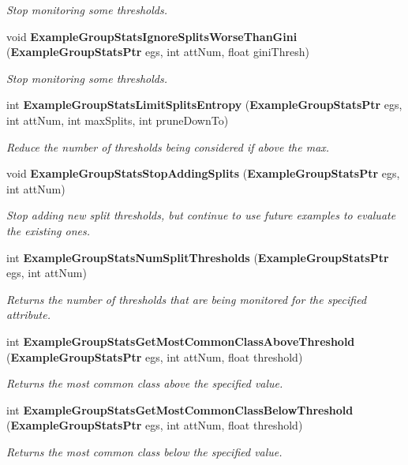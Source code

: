 \begin{CompactItemize}
\begin{CompactList}\small\item\em Stop monitoring some thresholds. \item\end{CompactList}\item 
void {\bf Example\-Group\-Stats\-Ignore\-Splits\-Worse\-Than\-Gini} ({\bf Example\-Group\-Stats\-Ptr} egs, int att\-Num, float gini\-Thresh)
\begin{CompactList}\small\item\em Stop monitoring some thresholds. \item\end{CompactList}\item 
int {\bf Example\-Group\-Stats\-Limit\-Splits\-Entropy} ({\bf Example\-Group\-Stats\-Ptr} egs, int att\-Num, int max\-Splits, int prune\-Down\-To)
\begin{CompactList}\small\item\em Reduce the number of thresholds being considered if above the max. \item\end{CompactList}\item 
void {\bf Example\-Group\-Stats\-Stop\-Adding\-Splits} ({\bf Example\-Group\-Stats\-Ptr} egs, int att\-Num)
\begin{CompactList}\small\item\em Stop adding new split thresholds, but continue to use future examples to evaluate the existing ones. \item\end{CompactList}\item 
int {\bf Example\-Group\-Stats\-Num\-Split\-Thresholds} ({\bf Example\-Group\-Stats\-Ptr} egs, int att\-Num)
\begin{CompactList}\small\item\em Returns the number of thresholds that are being monitored for the specified attribute. \item\end{CompactList}\item 
int {\bf Example\-Group\-Stats\-Get\-Most\-Common\-Class\-Above\-Threshold} ({\bf Example\-Group\-Stats\-Ptr} egs, int att\-Num, float threshold)
\begin{CompactList}\small\item\em Returns the most common class above the specified value. \item\end{CompactList}\item 
int {\bf Example\-Group\-Stats\-Get\-Most\-Common\-Class\-Below\-Threshold} ({\bf Example\-Group\-Stats\-Ptr} egs, int att\-Num, float threshold)
\begin{CompactList}\small\item\em Returns the most common class below the specified value. \item\end{CompactList}\end{CompactItemize}


